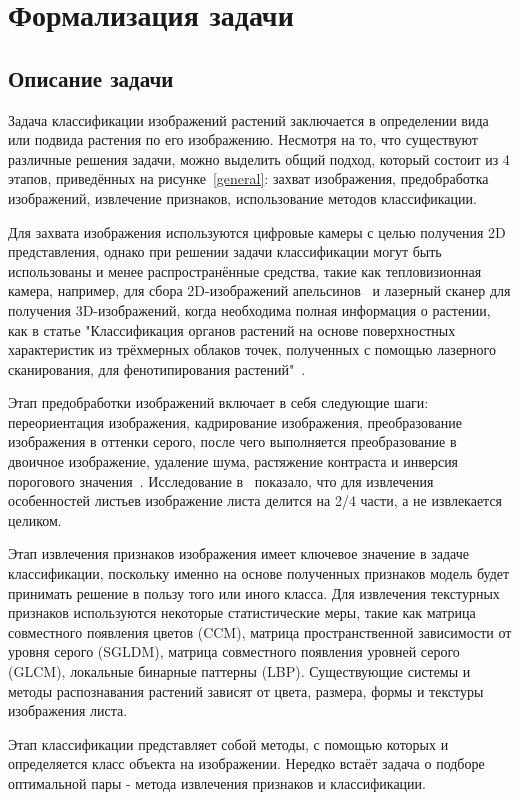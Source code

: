 \clearpage

\section{Формализация задачи}
\subsection{Описание задачи}
Задача классификации изображений растений заключается в определении вида или подвида растения по его изображению. Несмотря на то, что существуют различные решения задачи, можно выделить общий подход, который состоит из 4 этапов, приведённых на рисунке~\ref{general}: захват изображения, предобработка изображений, извлечение признаков, использование методов классификации.

Для захвата изображения используются цифровые камеры с целью получения 2D представления, однако при решении задачи классификации могут быть использованы и менее распространённые средства, такие как тепловизионная камера, например, для сбора 2D-изображений апельсинов~\cite{ref12} и лазерный сканер для получения 3D-изображений, когда необходима полная информация о растении, как в статье "Классификация органов растений на основе поверхностных характеристик из трёхмерных облаков точек, полученных с помощью лазерного сканирования, для
фенотипирования растений"~\cite{ref15}.

Этап предобработки изображений включает в себя следующие шаги: переориентация изображения, кадрирование изображения, преобразование изображения в оттенки серого, после чего выполняется преобразование в двоичное изображение, удаление шума, растяжение контраста и инверсия порогового значения~\cite{ref19}. Исследование в~\cite{ref20} показало, что для извлечения особенностей листьев изображение листа делится на 2/4 части, а не извлекается целиком.

Этап извлечения признаков изображения имеет ключевое значение в задаче классификации, поскольку именно на основе полученных признаков модель будет принимать решение в пользу того или иного класса. Для извлечения текстурных признаков используются некоторые статистические меры, такие как матрица совместного появления цветов (CCM), матрица пространственной зависимости от уровня серого (SGLDM), матрица совместного появления уровней серого (GLCM), локальные бинарные паттерны (LBP). Существующие системы и методы распознавания растений зависят от цвета, размера, формы и текстуры изображения листа.

Этап классификации представляет собой методы, с помощью которых и определяется класс объекта на изображении. Нередко встаёт задача о подборе оптимальной пары - метода извлечения признаков и классификации.

